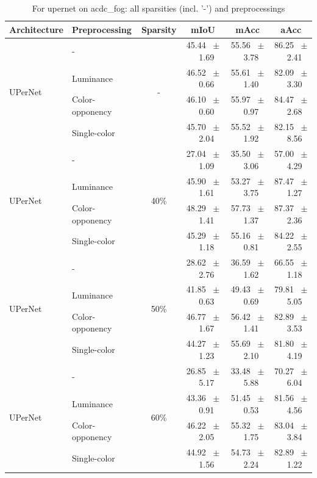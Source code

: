 \begin{table}[h]
  \centering
  \caption{For upernet on acdc_fog: all sparsities (incl. '-') and preprocessings}
  \begin{tabular}{@{}l l c c c c@{}}
    \toprule
    Architecture & Preprocessing & Sparsity & mIoU & mAcc & aAcc \\
    \midrule
    \multirow{4}{*}{UPerNet} & - & \multirow{4}{*}{-} & 45.44 ~$\pm$~ 1.69 & 55.56 ~$\pm$~ 3.78 & 86.25 ~$\pm$~ 2.41 \\
    & Luminance &  & 46.52 ~$\pm$~ 0.66 & 55.61 ~$\pm$~ 1.40 & 82.09 ~$\pm$~ 3.30 \\
    & Color-opponency &  & 46.10 ~$\pm$~ 0.60 & 55.97 ~$\pm$~ 0.97 & 84.47 ~$\pm$~ 2.68 \\
    & Single-color &  & 45.70 ~$\pm$~ 2.04 & 55.52 ~$\pm$~ 1.92 & 82.15 ~$\pm$~ 8.56 \\
    \midrule
    \multirow{4}{*}{UPerNet} & - & \multirow{4}{*}{40\%} & 27.04 ~$\pm$~ 1.09 & 35.50 ~$\pm$~ 3.06 & 57.00 ~$\pm$~ 4.29 \\
    & Luminance &  & 45.90 ~$\pm$~ 1.61 & 53.27 ~$\pm$~ 3.75 & 87.47 ~$\pm$~ 1.27 \\
    & Color-opponency &  & 48.29 ~$\pm$~ 1.41 & 57.73 ~$\pm$~ 1.37 & 87.37 ~$\pm$~ 2.36 \\
    & Single-color &  & 45.29 ~$\pm$~ 1.18 & 55.16 ~$\pm$~ 0.81 & 84.22 ~$\pm$~ 2.55 \\
    \midrule
    \multirow{4}{*}{UPerNet} & - & \multirow{4}{*}{50\%} & 28.62 ~$\pm$~ 2.76 & 36.59 ~$\pm$~ 1.62 & 66.55 ~$\pm$~ 1.18 \\
    & Luminance &  & 41.85 ~$\pm$~ 0.63 & 49.43 ~$\pm$~ 0.69 & 79.81 ~$\pm$~ 5.05 \\
    & Color-opponency &  & 46.77 ~$\pm$~ 1.67 & 56.42 ~$\pm$~ 1.41 & 82.89 ~$\pm$~ 3.53 \\
    & Single-color &  & 44.27 ~$\pm$~ 1.23 & 55.69 ~$\pm$~ 2.10 & 81.80 ~$\pm$~ 4.19 \\
    \midrule
    \multirow{4}{*}{UPerNet} & - & \multirow{4}{*}{60\%} & 26.85 ~$\pm$~ 5.17 & 33.48 ~$\pm$~ 5.88 & 70.27 ~$\pm$~ 6.04 \\
    & Luminance &  & 43.36 ~$\pm$~ 0.91 & 51.45 ~$\pm$~ 0.53 & 81.56 ~$\pm$~ 4.56 \\
    & Color-opponency &  & 46.22 ~$\pm$~ 2.05 & 55.32 ~$\pm$~ 1.75 & 83.04 ~$\pm$~ 3.84 \\
    & Single-color &  & 44.92 ~$\pm$~ 1.56 & 54.73 ~$\pm$~ 2.24 & 82.89 ~$\pm$~ 1.22 \\
    \midrule

\end{tabular}
\end{table}
